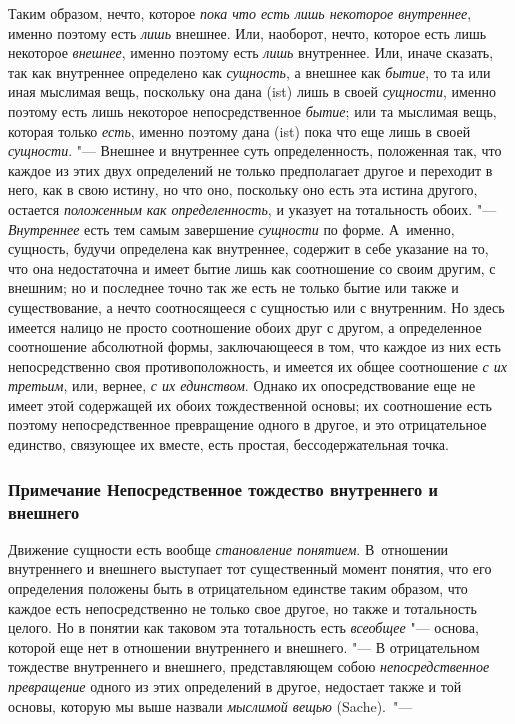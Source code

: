 Таким образом, нечто, которое {\em пока что есть лишь
некоторое внутреннее}, именно поэтому есть {\em лишь}
внешнее. Или, наоборот, нечто, которое есть лишь некоторое
{\em внешнее}, именно поэтому есть
{\em лишь} внутреннее. Или, иначе сказать, так как
внутреннее определено как {\em сущность}, а внешнее как
{\em бытие}, то та или иная мыслимая вещь, поскольку
она дана (ist) лишь в своей {\em сущности}, именно
поэтому есть лишь некоторое непосредственное
{\em бытие}; или та мыслимая вещь, которая только
{\em есть}, именно поэтому дана (ist) пока что еще лишь
в своей {\em сущности}. "--- Внешнее и внутреннее суть
определенность, положенная так, что каждое из этих двух определений не
только предполагает другое и переходит в него, как в свою истину, но что
оно, поскольку оно есть эта истина другого, остается
{\em положенным как определенность}, и указует на
тотальность обоих. "--- {\em Внутреннее} есть тем самым
завершение {\em сущности} по форме. А~именно, сущность,
будучи определена как внутреннее, содержит в себе указание на то, что она
недостаточна и имеет бытие лишь как соотношение со своим другим, с внешним;
но и последнее точно так же есть не только бытие или также и существование,
а нечто соотносящееся с сущностью или с внутренним. Но здесь имеется налицо
не просто соотношение обоих друг с другом, а определенное соотношение
абсолютной формы, заключающееся в том, что каждое из них есть
непосредственно своя противоположность, и имеется их общее соотношение
{\em с их третьим}, или, вернее,
{\em с их единством}. Однако их опосредствование еще не
имеет этой содержащей их обоих тождественной основы; их соотношение есть
поэтому непосредственное превращение одного в другое, и это отрицательное
единство, связующее их вместе, есть простая, бессодержательная точка.


\subsubsection[Примечание Непосредственное тождество внутреннего и внешнего]
{Примечание Непосредственное тождество внутреннего и внешнего}

Движение сущности есть вообще {\em становление
понятием}. В~отношении внутреннего и внешнего выступает тот существенный
момент понятия, что его определения положены быть в отрицательном единстве
таким образом, что каждое есть непосредственно не только свое другое, но
также и тотальность целого. Но в понятии как таковом эта тотальность есть
{\em всеобщее} "--- основа, которой еще нет в отношении
внутреннего и внешнего. "--- В отрицательном тождестве внутреннего и внешнего,
представляющем собою {\em непосредственное превращение}
одного из этих определений в другое, недостает также и той основы, которую
мы выше назвали {\em мыслимой вещью} (Sache).~"---

